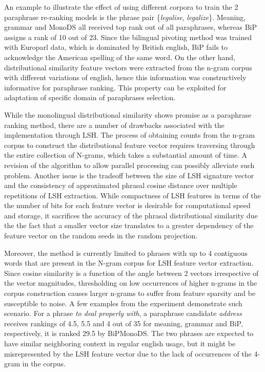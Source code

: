 \documentclass[11pt]{article}
\begin{document}
An example to illustrate the effect of using different corpora to train the 2 paraphrase re-ranking models is the phrase pair \{\emph{legalise}, \emph{legalize}\}. Meaning, grammar and MonoDS all received top rank out of all paraphrases, whereas BiP assigns a rank of 10 out of 23. Since the bilingual pivoting method was trained with Europarl data, which is dominated by British english, BiP fails to acknowledge the American spelling of the same word. On the other hand, distributional similarity feature vectors were extracted from the n-gram corpus with different variations of english, hence this information was constructively informative for paraphrase ranking. This property can be exploited for adaptation of specific domain of paraphrases selection.



While the monolingual distributional similarity shows promise as a paraphrase ranking method, there are a number of drawbacks associated with the implementation through LSH. The process of obtaining counts from the n-gram corpus to construct the distributional feature vector requires traversing through the entire collection of N-grams, which takes a substantial amount of time. A revision of the algorithm to allow parallel processing can possibly alleviate such problem. Another issue is the tradeoff between the size of LSH signature vector and the consistency of approximated phrasal cosine distance over multiple repetitions of LSH extraction. While compactness of LSH features in terms of the the number of bits for each feature vector is desirable for computational speed and storage, it sacrifices the accuracy of the phrasal distributional similarity due the the fact that a smaller vector size translates to a greater dependency of the feature vector on the random seeds in the random projection. 

Moreover, the method is currently limited to phrases with up to 4 contiguous words that are present in the N-gram corpus for LSH feature vector extraction. Since cosine similarity is a function of the angle between 2 vectors irrespective of the vector magnitudes, thresholding on low occurrences of higher n-grams in the corpus construction causes larger n-grams to suffer from feature sparsity and be susceptible to noise. A few examples from the experiment demonstrate such scenario. For a phrase \emph{to deal properly with}, a paraphrase candidate \emph{address} receives rankings of 4.5, 5.5 and 4 out of 35 for meaning, grammar and BiP, respectively, it is ranked 29.5 by BiPMonoDS. The two phrases are expected to have similar neighboring context in regular english usage, but it might be misrepresented by the LSH feature vector due to the lack of occurrences of the 4-gram in the corpus.
\end{document}
